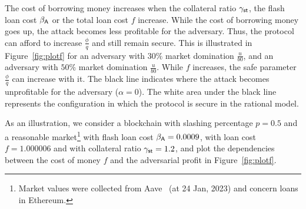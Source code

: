 The cost of borrowing money increases when the collateral ratio
$\gamma_{\textsf{st}}$, the flash loan cost $\beta_{\textsf{A}}$ or the total loan cost $f$
increase. While the cost of borrowing money goes up, the attack becomes less profitable
for the adversary. Thus, the protocol can afford to increase $\frac{\phi}{q}$
and still remain secure. This is illustrated in
Figure~\ref{fig:plotf} for an adversary with $30\%$ market domination $\frac{u}{b0}$,
and an adversary with $50\%$ market domination $\frac{u}{b0}$.
While $f$ increases, the safe parameter $\frac{\phi}{q}$ can increase with it.
The black line indicates where the attack becomes unprofitable for the adversary ($\alpha = 0$).
The white area under the black line represents the configuration in which
the protocol is secure in the rational model.

As an illustration,
we consider a blockchain with slashing percentage
$p = 0.5$ and a reasonable market\footnote{Market values were collected from
Aave~\cite{aave} (at 24 Jan, 2023) and concern loans in Ethereum.}
with \asset flash loan cost $\beta_{\textsf{A}} = 0.0009$,
with \stasset loan cost $f = 1.000006$ and with collateral ratio $\gamma_{\textsf{st}} = 1.2$,
and plot the dependencies between the cost of money $f$ and the adversarial
profit in Figure~\ref{fig:plotf}.


